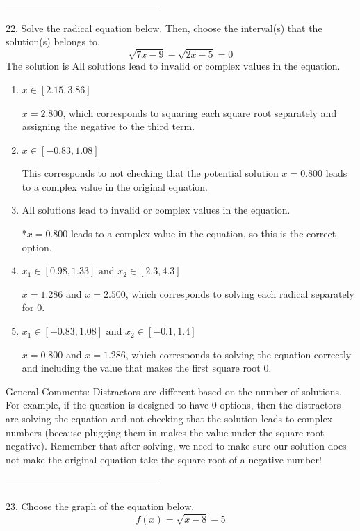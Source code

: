\documentclass{article}[14pt]
\begin{document}
-----------------------------------------------

22. Solve the radical equation below. Then, choose the interval(s) that the solution(s) belongs to.
$$ \sqrt{7 x - 9} - \sqrt{2 x - 5} = 0 $$ 
The solution is $ \text{All solutions lead to invalid or complex values in the equation.} $ 

\begin{enumerate}[label=\Alph*.] 
\item $ x \in [2.15,3.86] $ 

 $x = 2.800$, which corresponds to squaring each square root separately and assigning the negative to the third term. 
\item $ x \in [-0.83,1.08] $ 

 This corresponds to not checking that the potential solution $x = 0.800$ leads to a complex value in the original equation. 
\item $ \text{All solutions lead to invalid or complex values in the equation.} $ 

 *$x = 0.800$ leads to a complex value in the equation, so this is the correct option. 
\item $ x_1 \in [0.98, 1.33] \text{ and } x_2 \in [2.3,4.3] $ 

 $x = 1.286$ and $x = 2.500$, which corresponds to solving each radical separately for 0. 
\item $ x_1 \in [-0.83, 1.08] \text{ and } x_2 \in [-0.1,1.4] $ 

 $x = 0.800$ and $x = 1.286$, which corresponds to solving the equation correctly and including the value that makes the first square root 0. 
\end{enumerate} 
 
General Comments: Distractors are different based on the number of solutions. For example, if the question is designed to have 0 options, then the distractors are solving the equation and not checking that the solution leads to complex numbers (because plugging them in makes the value under the square root negative). Remember that after solving, we need to make sure our solution does not make the original equation take the square root of a negative number!

-----------------------------------------------

23. Choose the graph of the equation below.
$$ f(x) = \sqrt{x - 8} - 5 $$ 
\end{document}
